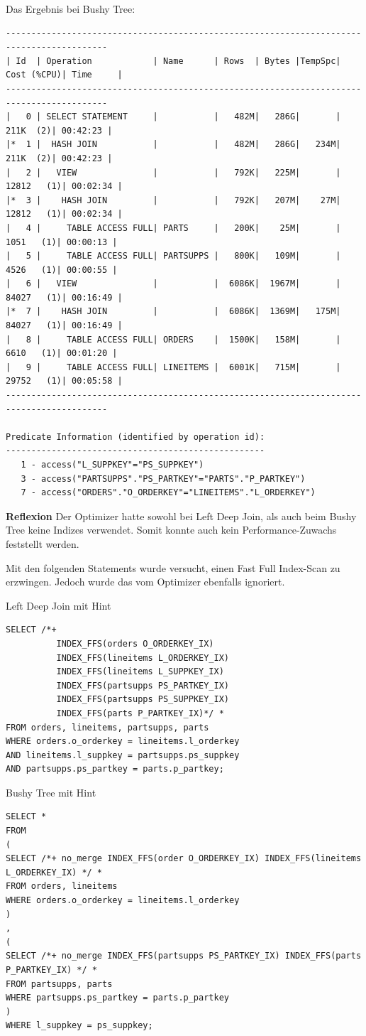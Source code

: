 \documentclass[10pt]{article}
\begin{document}
Das Ergebnis bei Bushy Tree:
\begin{lstlisting}[style=queryexecutionplan]
------------------------------------------------------------------------------------------
| Id  | Operation            | Name      | Rows  | Bytes |TempSpc| Cost (%CPU)| Time     |
------------------------------------------------------------------------------------------
|   0 | SELECT STATEMENT     |           |   482M|   286G|       |   211K  (2)| 00:42:23 |
|*  1 |  HASH JOIN           |           |   482M|   286G|   234M|   211K  (2)| 00:42:23 |
|   2 |   VIEW               |           |   792K|   225M|       | 12812   (1)| 00:02:34 |
|*  3 |    HASH JOIN         |           |   792K|   207M|    27M| 12812   (1)| 00:02:34 |
|   4 |     TABLE ACCESS FULL| PARTS     |   200K|    25M|       |  1051   (1)| 00:00:13 |
|   5 |     TABLE ACCESS FULL| PARTSUPPS |   800K|   109M|       |  4526   (1)| 00:00:55 |
|   6 |   VIEW               |           |  6086K|  1967M|       | 84027   (1)| 00:16:49 |
|*  7 |    HASH JOIN         |           |  6086K|  1369M|   175M| 84027   (1)| 00:16:49 |
|   8 |     TABLE ACCESS FULL| ORDERS    |  1500K|   158M|       |  6610   (1)| 00:01:20 |
|   9 |     TABLE ACCESS FULL| LINEITEMS |  6001K|   715M|       | 29752   (1)| 00:05:58 |
------------------------------------------------------------------------------------------
 
Predicate Information (identified by operation id):
---------------------------------------------------
   1 - access("L_SUPPKEY"="PS_SUPPKEY")
   3 - access("PARTSUPPS"."PS_PARTKEY"="PARTS"."P_PARTKEY")
   7 - access("ORDERS"."O_ORDERKEY"="LINEITEMS"."L_ORDERKEY")
\end{lstlisting}
\textbf{Reflexion} \newline
Der Optimizer hatte sowohl bei Left Deep Join, als auch beim Bushy Tree keine Indizes verwendet.
Somit konnte auch kein Performance-Zuwachs feststellt werden.

Mit den folgenden Statements wurde versucht, einen Fast Full Index-Scan zu erzwingen. Jedoch wurde das vom Optimizer ebenfalls ignoriert.

Left Deep Join mit Hint
\begin{lstlisting}[style=sql]
SELECT /*+ 
          INDEX_FFS(orders O_ORDERKEY_IX) 
          INDEX_FFS(lineitems L_ORDERKEY_IX) 
          INDEX_FFS(lineitems L_SUPPKEY_IX) 
          INDEX_FFS(partsupps PS_PARTKEY_IX) 
          INDEX_FFS(partsupps PS_SUPPKEY_IX) 
          INDEX_FFS(parts P_PARTKEY_IX)*/ *
FROM orders, lineitems, partsupps, parts
WHERE orders.o_orderkey = lineitems.l_orderkey
AND lineitems.l_suppkey = partsupps.ps_suppkey
AND partsupps.ps_partkey = parts.p_partkey;
\end{lstlisting}
Bushy Tree mit Hint
\begin{lstlisting}[style=sql]
SELECT *
FROM 
(
SELECT /*+ no_merge INDEX_FFS(order O_ORDERKEY_IX) INDEX_FFS(lineitems L_ORDERKEY_IX) */ *
FROM orders, lineitems
WHERE orders.o_orderkey = lineitems.l_orderkey
)
,
(
SELECT /*+ no_merge INDEX_FFS(partsupps PS_PARTKEY_IX) INDEX_FFS(parts P_PARTKEY_IX) */ *
FROM partsupps, parts
WHERE partsupps.ps_partkey = parts.p_partkey
)
WHERE l_suppkey = ps_suppkey;
\end{lstlisting}
\end{document}
